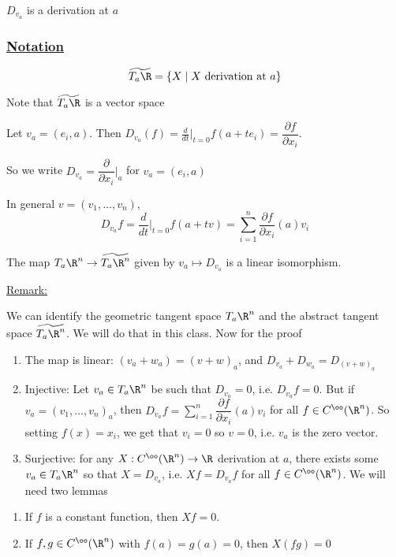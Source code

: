 \documentclass[x11names,reqno,14pt]{extarticle}
\newcommand{\pp}[2]{\dfrac{\partial #1}{\partial #2}}
\newcommand{\dd}[2]{\dfrac{d#1}{d#2}}
\begin{document}
\exm

$D_{v_a}$ is a derivation at $a$

\subsubsection*{\underline{Notation}}
\[
\widetilde{T_a\R} = \{X \mid X\text{ derivation at }a\}
\]

Note that $\widetilde{T_a\R}$ is a vector space

\exm

Let $v_a = (e_i, a)$. Then $D_{v_a}(f) = \frac{d}{dt}|_{t=0}f(a + te_i) = \pp{f}{x_i}$. 

So we write $D_{v_a} = \pp{}{x_i}|_a$ for $v_a = (e_i, a)$

In general $v = (v_1, \dots, v_n)$, 
\[
D_{v_a}f = \dd{}{t}|_{t=0}f(a + tv) = \sum_{i=1}^n\pp{f}{x_i}(a)v_i
\]

\prop

The map $T_a\R^n\to\widetilde{T_a\R^n}$ given by $v_a \mapsto D_{v_a}$ is a linear isomorphism. 

\proof

\underline{Remark:}

We can identify the geometric tangent space $T_a\R^n$ and the abstract tangent space $\widetilde{T_a\R^n}$. We will do that in this class. Now for the proof

\begin{enumerate}[label=(\roman*)]

\item The map is linear: $(v_a + w_a) = (v + w)_a$, and $D_{v_a} + D_{w_a} = D_{(v + w)_a}$

\item Injective: Let $v_a \in T_a\R^n$ be such that $D_{v_a} = 0$, i.e. $D_{v_a}f = 0$. But if $v_a=(v_1, \dots, v_n)_a$, then $D_{v_a}f = \sum_{i=1}^n\pp{f}{x_i}(a)v_i$ for all $f \in C^\oo(\R^n)$. So setting $f(x) = x_i$, we get that $v_i = 0$ so $v = 0$, i.e. $v_a$ is the zero vector. 

\item Surjective: for any $X:C^\oo(\R^n)\to\R$ derivation at $a$, there exists some $v_a \in T_a\R^n$ so that $X = D_{v_a}$, i.e. $Xf = D_{v_a}f$ for all $f \in C^\oo(\R^n)$. We will need two lemmas

\end{enumerate}


\lem

\begin{enumerate}

\item If $f$ is a constant function, then $Xf = 0$. 

\item If $f, g \in C^\oo(\R^n)$ with $f(a) = g(a) = 0$, then $X(fg) = 0$

\end{enumerate}
\end{document}
